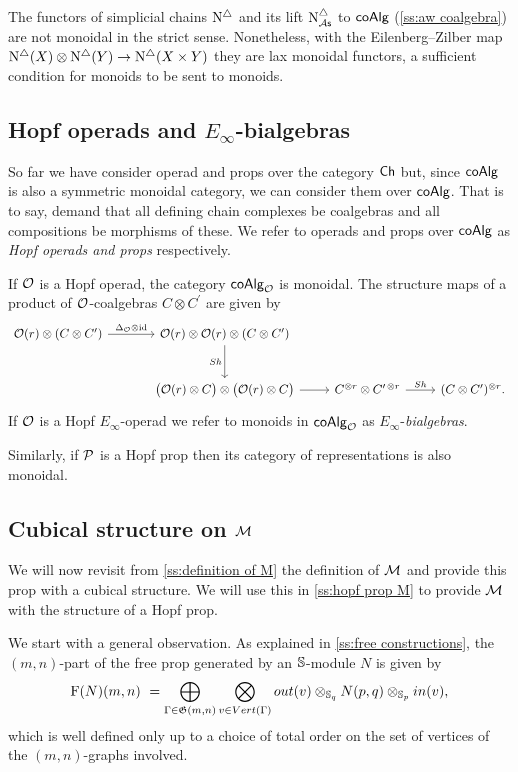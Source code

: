 The functors of simplicial chains $\schains$ and its lift $\schainsAS$ to $\coAlg$ (\cref{ss:aw coalgebra}) are not monoidal in the strict sense.
Nonetheless, with the Eilenberg--Zilber map $\schains(X) \otimes \schains(Y) \to \schains(X \times Y)$ they are lax monoidal functors, a sufficient condition for monoids to be sent to monoids.

\subsection{Hopf operads and $E_\infty$-bialgebras}

So far we have consider operad and props over the category $\Ch$ but, since $\coAlg$ is also a symmetric monoidal category, we can consider them over $\coAlg$.
That is to say, demand that all defining chain complexes be coalgebras and all compositions be morphisms of these.
We refer to operads and props over $\coAlg$ as \textit{Hopf operads and props} respectively.

If $\O$ is a Hopf operad, the category $\coAlg_\O$ is monoidal.
The structure maps of a product of $\O$-coalgebras $C \otimes C^\prime$ are given by
\[
\begin{tikzcd} [column sep = normal, row sep=large]
\O(r) \otimes (C \otimes C^\prime) \arrow[r, "\Delta_\O \otimes \id"] &[10 pt] \O(r) \otimes \O(r) \otimes (C \otimes C^\prime) \arrow[d, "Sh"'] & & \\ &
\big(\O(r) \otimes C \big) \otimes \big( \O(r) \otimes C \big) \arrow[r] & 
C^{\otimes r} \otimes C^{\prime\, \otimes r} \arrow[r, "Sh"] &
(C \otimes C^\prime)^{\otimes r}.
\end{tikzcd}
\]
If $\O$ is a Hopf $E_\infty$-operad we refer to monoids in $\coAlg_\O$ as $E_\infty$-\textit{bialgebras}.

Similarly, if $\P$ is a Hopf prop then its category of representations is also monoidal.

\subsection{Cubical structure on $\M$}

We will now revisit from \cref{ss:definition of M} the definition of $\M$ and provide this prop with a cubical structure.
We will use this in \cref{ss:hopf prop M} to provide $\M$ with the structure of a Hopf prop.

We start with a general observation.
As explained in \cref{ss:free constructions}, the $(m,n)$-part of the free prop generated by an $\S$-module $N$ is given by
\[
\F(N)(m,n) \ = \bigoplus_{\Gamma \in \G(m,n)} \bigotimes_{v \in Vert(\Gamma)} out(v) \otimes_{\S_q} N(p, q) \otimes_{\S_p} in(v),
\]
which is well defined only up to a choice of total order on the set of vertices of the $(m,n)$-graphs involved.

